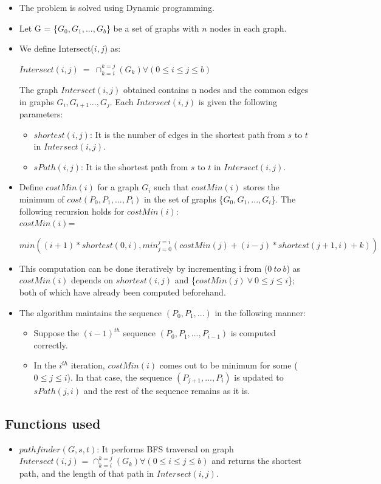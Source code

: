 \documentclass[pdftex,a4paper,12pt]{report}
\begin{document}
\begin{itemize}
\item The problem is solved using Dynamic programming.
\item Let G = \{$G_0,G_1,...,G_b$\} be a set of graphs with $n$ nodes in each graph.
\item We define Intersect($i,j$) as:
\begin{center}
$Intersect(i,j)\ =\ \cap_{k=i}^{k=j}(G_{k}) \forall (0 \leq i \leq j \leq b)$
\end{center}
The graph $Intersect(i,j)$ obtained contains n nodes and the common edges in graphs $G_i,G_{i+1}...,G_j$. Each $Intersect(i,j)$ is given the following parameters:
\begin{itemize}
\item $shortest(i,j)$: It is the number of edges in the shortest path from $s$ to $t$ in $Intersect(i,j)$.
\item $sPath(i,j)$: It is the shortest path from $s$ to $t$ in $Intersect(i,j)$.
\end{itemize}
\item Define $costMin(i)$ for a graph $G_i$ such that $costMin(i)$ stores the minimum of $cost(P_0,P_1,...,P_i)$ in the set of graphs \{$G_0,G_1,...,G_i$\}. The following recursion holds for $costMin(i)$:\\
$costMin(i)$=
\begin{center}
$ min((i+1)*shortest(0,i),min_{j=0}^{j=i}(costMin(j)+(i-j)*shortest(j+1,i)+k))$
\end{center}
\item This computation can be done iteratively by incrementing i from ($0\ to\ b$) as $costMin(i)$ depends on $shortest(i,j)$ and \{$costMin(j)\ \forall\ 0\leq j \leq i$\}; both of which have already been computed beforehand.
\item The algorithm maintains the sequence $(P_0,P_1,...)$ in the following manner:
\begin{itemize}
\item Suppose the $(i-1)^{th}$ sequence $(P_0,P_1,...,P_{i-1})$ is computed correctly.
\item In the $i^{th}$ iteration, $costMin(i)$ comes out to be minimum for some  ($0\leq j \leq i$). In that case, the sequence $(P_{j+1},...,P_i)$ is updated to $sPath(j,i)$ and the rest of the sequence remains as it is.
\end{itemize}
\end{itemize}
\subsection{Functions used}
\begin{itemize}
\item $pathfinder(G,s,t)$: It performs BFS traversal on graph \\
$Intersect(i,j)$ = $\cap_{k=i}^{k=j}(G_{k}) \forall (0 \leq i \leq j \leq b)$ and returns the shortest path, and the length of that path in $Intersect(i,j)$.
\end{itemize}
\newpage
\end{document}
